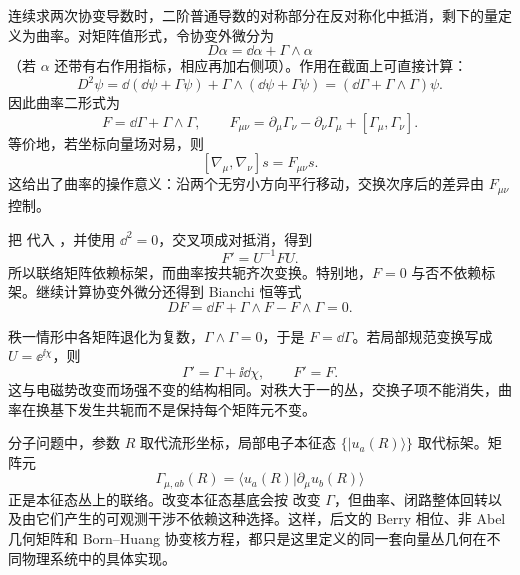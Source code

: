 连续求两次协变导数时，二阶普通导数的对称部分在反对称化中抵消，剩下的量定义为曲率。对矩阵值形式，令协变外微分为
\[
D\alpha=\dd\alpha+\Gamma\wedge\alpha
\]
（若 \(\alpha\) 还带有右作用指标，相应再加右侧项）。作用在截面上可直接计算：
\[
D^2\psi
=\dd(\dd\psi+\Gamma\psi)
+\Gamma\wedge(\dd\psi+\Gamma\psi)
=(\dd\Gamma+\Gamma\wedge\Gamma)\psi.
\]
因此曲率二形式为
\begin{equation}
F=\dd\Gamma+\Gamma\wedge\Gamma,
\qquad
F_{\mu\nu}
=\partial_\mu\Gamma_\nu-
\partial_\nu\Gamma_\mu+[\Gamma_\mu,\Gamma_\nu].
\label{eq:curvature-primer}
\end{equation}
等价地，若坐标向量场对易，则
\[
[\nabla_\mu,\nabla_\nu]s=F_{\mu\nu}s.
\]
这给出了曲率的操作意义：沿两个无穷小方向平行移动，交换次序后的差异由 \(F_{\mu\nu}\) 控制。

把  代入 ，并使用 \(\dd^2=0\)，交叉项成对抵消，得到
\begin{equation}
F'=U^{-1}FU.
\label{eq:curvature-transform-primer}
\end{equation}
所以联络矩阵依赖标架，而曲率按共轭齐次变换。特别地，\(F=0\) 与否不依赖标架。继续计算协变外微分还得到 Bianchi 恒等式
\[
DF=\dd F+\Gamma\wedge F-F\wedge\Gamma=0.
\]

秩一情形中各矩阵退化为复数，\(\Gamma\wedge\Gamma=0\)，于是 \(F=\dd\Gamma\)。若局部规范变换写成 \(U=\ee^{\ii\chi}\)，则
\[
\Gamma'=\Gamma+\ii\dd\chi,
\qquad F'=F.
\]
这与电磁势改变而场强不变的结构相同。对秩大于一的丛，交换子项不能消失，曲率在换基下发生共轭而不是保持每个矩阵元不变。

分子问题中，参数 \(R\) 取代流形坐标，局部电子本征态 \(\{|u_a(R)\rangle\}\) 取代标架。矩阵元
\[
\Gamma_{\mu,ab}(R)=
\langle u_a(R)|\partial_\mu u_b(R)\rangle
\]
正是本征态丛上的联络。改变本征态基底会按  改变 \(\Gamma\)，但曲率、闭路整体回转以及由它们产生的可观测干涉不依赖这种选择。这样，后文的 Berry 相位、非 Abel 几何矩阵和 Born--Huang 协变核方程，都只是这里定义的同一套向量丛几何在不同物理系统中的具体实现。
